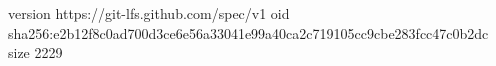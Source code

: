 version https://git-lfs.github.com/spec/v1
oid sha256:e2b12f8c0ad700d3ce6e56a33041e99a40ca2c719105cc9cbe283fcc47c0b2dc
size 2229
